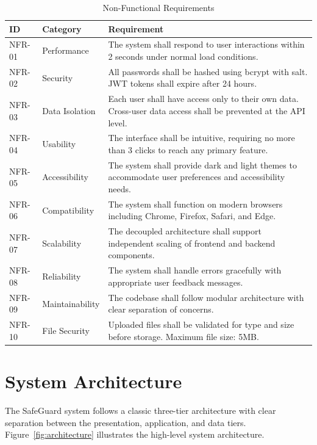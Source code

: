 \begin{table}[H]
  \centering
  \caption{Non-Functional Requirements}
  \label{tab:nfr}
  \begin{tabularx}{\textwidth}{@{}l l X@{}}
    \toprule
    \textbf{ID} & \textbf{Category} & \textbf{Requirement} \\
    \midrule
    NFR-01 & Performance & The system shall respond to user interactions within 2 seconds under normal load conditions. \\
    NFR-02 & Security & All passwords shall be hashed using bcrypt with salt. JWT tokens shall expire after 24 hours. \\
    NFR-03 & Data Isolation & Each user shall have access only to their own data. Cross-user data access shall be prevented at the API level. \\
    NFR-04 & Usability & The interface shall be intuitive, requiring no more than 3 clicks to reach any primary feature. \\
    NFR-05 & Accessibility & The system shall provide dark and light themes to accommodate user preferences and accessibility needs. \\
    NFR-06 & Compatibility & The system shall function on modern browsers including Chrome, Firefox, Safari, and Edge. \\
    NFR-07 & Scalability & The decoupled architecture shall support independent scaling of frontend and backend components. \\
    NFR-08 & Reliability & The system shall handle errors gracefully with appropriate user feedback messages. \\
    NFR-09 & Maintainability & The codebase shall follow modular architecture with clear separation of concerns. \\
    NFR-10 & File Security & Uploaded files shall be validated for type and size before storage. Maximum file size: 5MB. \\
    \bottomrule
  \end{tabularx}
\end{table}

\section{System Architecture}

The SafeGuard system follows a classic three-tier architecture with clear separation between the presentation, application, and data tiers. Figure~\ref{fig:architecture} illustrates the high-level system architecture.

